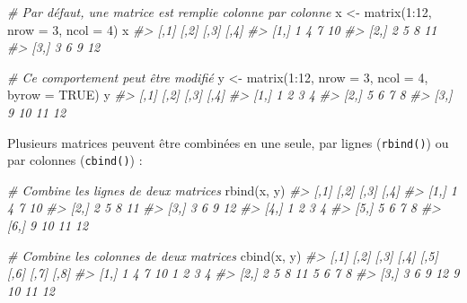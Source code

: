 \documentclass[
  french,
]{scrbook}
\newenvironment{Shaded}{\begin{snugshade}}{\end{snugshade}}
\newcommand{\AttributeTok}[1]{\textcolor[rgb]{0.77,0.63,0.00}{#1}}
\newcommand{\CommentTok}[1]{\textcolor[rgb]{0.56,0.35,0.01}{\textit{#1}}}
\newcommand{\ConstantTok}[1]{\textcolor[rgb]{0.00,0.00,0.00}{#1}}
\newcommand{\DecValTok}[1]{\textcolor[rgb]{0.00,0.00,0.81}{#1}}
\newcommand{\FunctionTok}[1]{\textcolor[rgb]{0.00,0.00,0.00}{#1}}
\newcommand{\NormalTok}[1]{#1}
\newcommand{\OtherTok}[1]{\textcolor[rgb]{0.56,0.35,0.01}{#1}}
\newcommand{\SpecialCharTok}[1]{\textcolor[rgb]{0.00,0.00,0.00}{#1}}
\begin{document}
\begin{Shaded}
\begin{Highlighting}[]
\CommentTok{\# Par défaut, une matrice est remplie colonne par colonne}
\NormalTok{x }\OtherTok{\textless{}{-}} \FunctionTok{matrix}\NormalTok{(}\DecValTok{1}\SpecialCharTok{:}\DecValTok{12}\NormalTok{, }\AttributeTok{nrow =} \DecValTok{3}\NormalTok{, }\AttributeTok{ncol =} \DecValTok{4}\NormalTok{)}
\NormalTok{x}
\CommentTok{\#\textgreater{}      [,1] [,2] [,3] [,4]}
\CommentTok{\#\textgreater{} [1,]    1    4    7   10}
\CommentTok{\#\textgreater{} [2,]    2    5    8   11}
\CommentTok{\#\textgreater{} [3,]    3    6    9   12}

\CommentTok{\# Ce comportement peut être modifié}
\NormalTok{y }\OtherTok{\textless{}{-}} \FunctionTok{matrix}\NormalTok{(}\DecValTok{1}\SpecialCharTok{:}\DecValTok{12}\NormalTok{, }\AttributeTok{nrow =} \DecValTok{3}\NormalTok{, }\AttributeTok{ncol =} \DecValTok{4}\NormalTok{, }\AttributeTok{byrow =} \ConstantTok{TRUE}\NormalTok{)}
\NormalTok{y}
\CommentTok{\#\textgreater{}      [,1] [,2] [,3] [,4]}
\CommentTok{\#\textgreater{} [1,]    1    2    3    4}
\CommentTok{\#\textgreater{} [2,]    5    6    7    8}
\CommentTok{\#\textgreater{} [3,]    9   10   11   12}
\end{Highlighting}
\end{Shaded}

Plusieurs matrices peuvent être combinées en une seule, par lignes (\texttt{rbind()}) ou par colonnes (\texttt{cbind()}) :

\begin{Shaded}
\begin{Highlighting}[]
\CommentTok{\# Combine les lignes de deux matrices}
\FunctionTok{rbind}\NormalTok{(x, y)}
\CommentTok{\#\textgreater{}      [,1] [,2] [,3] [,4]}
\CommentTok{\#\textgreater{} [1,]    1    4    7   10}
\CommentTok{\#\textgreater{} [2,]    2    5    8   11}
\CommentTok{\#\textgreater{} [3,]    3    6    9   12}
\CommentTok{\#\textgreater{} [4,]    1    2    3    4}
\CommentTok{\#\textgreater{} [5,]    5    6    7    8}
\CommentTok{\#\textgreater{} [6,]    9   10   11   12}

\CommentTok{\# Combine les colonnes de deux matrices}
\FunctionTok{cbind}\NormalTok{(x, y)}
\CommentTok{\#\textgreater{}      [,1] [,2] [,3] [,4] [,5] [,6] [,7] [,8]}
\CommentTok{\#\textgreater{} [1,]    1    4    7   10    1    2    3    4}
\CommentTok{\#\textgreater{} [2,]    2    5    8   11    5    6    7    8}
\CommentTok{\#\textgreater{} [3,]    3    6    9   12    9   10   11   12}
\end{Highlighting}
\end{Shaded}
\end{document}
